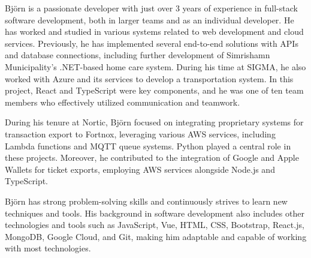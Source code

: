 Björn is a passionate developer with just over 3 years of experience in full-stack software development, both in larger teams and as an individual developer. He has worked and studied in various systems related to web development and cloud services. Previously, he has implemented several end-to-end solutions with APIs and database connections, including further development of Simrishamn Municipality's .NET-based home care system. During his time at SIGMA, he also worked with Azure and its services to develop a transportation system. In this project, React and TypeScript were key components, and he was one of ten team members who effectively utilized communication and teamwork.

\vspace{6pt}
During his tenure at Nortic, Björn focused on integrating proprietary systems for transaction export to Fortnox, leveraging various AWS services, including Lambda functions and MQTT queue systems. Python played a central role in these projects.
Moreover, he contributed to the integration of Google and Apple Wallets for ticket exports, employing AWS services alongside Node.js and TypeScript.

\vspace{6pt}
Björn has strong problem-solving skills and continuously strives to learn new techniques and tools. His background in software development also includes other technologies and tools such as JavaScript, Vue, HTML, CSS, Bootstrap, React.js, MongoDB, Google Cloud, and Git, making him adaptable and capable of working with most technologies.